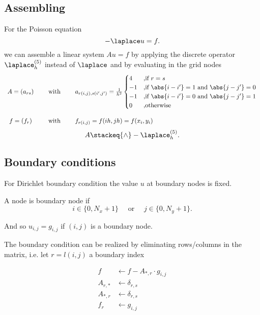 \subsection{Assembling}%
\label{sec:Assembling}

For the Poisson equation
\[
-\laplace u = f
.\] 
we can assemble a linear system $Au=f$ by applying the discrete operator $\laplace_{h}^{(5)}$ instead of $\laplace$ and by evaluating in the grid nodes
\[
	\begin{array}{ccl}
	A = (a_{rs}) 
	\quad&\text{ with }\quad 
	&a_{r(i,j),s(i',j')}= \frac{1}{h^{2}}\begin{cases}
		4 &\text{,if } r=s \\
		-1 &\text{,if } \abs{i-i'} = 1 \text{ and } \abs{j-j'} = 0 \\
		-1 &\text{,if } \abs{i-i'} = 0 \text{ and } \abs{j-j'} = 1 \\
		0 &\text{,otherwise}
	\end{cases} \\ \\
	f = (f_{r}) 
	\quad&\text{ with }\quad
	&f_{r(i,j)}=f(ih, jh)=f(x_{i}, y_{i})
	\end{array}
\] 
\[
	 A \stackeq{\wedge} -\laplace_{h}^{(5)}
.\] 

\subsection{Boundary conditions}%
\label{sec:Boundary condition}
For Dirichlet boundary condition the value $u$ at boundary nodes is fixed.

A node is boundary node if
\[
i \in  \{0, N_{x}+1\} \quad\text{ or }\quad j \in  \{0,N_{y}+1\}
.\] 

And so $u_{i,j} = g_{i,j}$ if $(i,j)$ is a boundary node.

The boundary condition can be realized by eliminating rows/columns in the matrix, i.e. let $r=l(i,j)$ a boundary index

\begin{align*}
	f &\leftarrow f-A_{\ast,r}\cdot g_{i,j} \\
	A_{r,\ast} &\leftarrow \delta_{r,s} \\
	A_{*,r} &\leftarrow \delta_{r,s} \\
	f_{r} &\leftarrow g_{i,j}
\end{align*}

